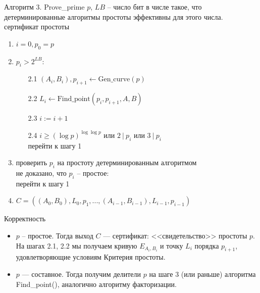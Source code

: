 \documentclass{beamer}
\begin{document}
\begin{frame}{Алгоритм 3. Prove\_prime}
         $p$, $LB$ -- число бит в числе такое, что детерминированные алгоритмы простоты эффективны для этого числа.\\
         сертификат простоты
        
        \begin{enumerate}
            \item $i = 0, p_0 = p$
            \item {} {$p_i > 2^{LB}$}:
            \begin{enumerate}
                \item[2.1] $(A_i, B_i), p_{i+1} \leftarrow \text{Gen\_curve}(p)$
                \item[2.2] $L_i \leftarrow \text{Find\_point} (p_i, p_{i+1}, A, B)$
                \item[2.3] $i := i+1$
                \item[2.4]  {$i \geq (\log p)^{\log\log p}$ или $2\ |\ p_i$ или $3\ |\ p_i$}\\
                \quad перейти к шагу 1
            \end{enumerate}
            \item проверить $p_i$ на простоту детерминированным алгоритмом\\
             {не доказано, что $p_i$ -- простое}:\\
            \quad перейти к шагу 1
            \item {} $C = ((A_0, B_0), L_0, p_1, ..., (A_{i-1}, B_{i-1}), L_{i-1}, p_{i-1})$
        \end{enumerate}
\end{frame}

\begin{frame}{Корректность}
\begin{itemize}
    \item $p$ -- простое. Тогда выход $C$ — сертификат:  <<свидетельство>> простоты $p$. На шагах 2.1, 2.2 мы получаем кривую $E_{A_i, B_i}$  и точку $L_i$ порядка $p_{i+1}$, удовлетворяющие условиям Критерия простоты.
    \item $p$ — составное. Тогда получим делители $p$ на шаге 3 (или раньше) алгоритма Find\_point(), аналогично алгоритму факторизации. 
\end{itemize}
\end{frame}
\end{document}
